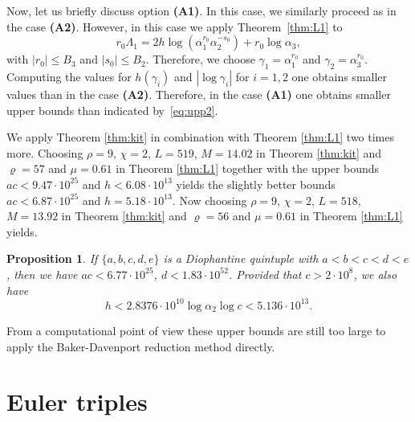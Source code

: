 \documentclass{amsart}
\newtheorem{proposition}{Proposition}
\theoremstyle{definition}
\begin{document}
Now, let us briefly discuss option \textbf{(A1)}. In this case, we similarly proceed as in the case \textbf{(A2)}.
However, in this case we apply Theorem~\ref{thm:L1} to 
$$
r_0\Lambda_1 = 2h\log\left(\alpha_1^{r_0} \alpha_2^{-s_0}\right) + r_0\log\alpha_3,
$$
with $|r_0|\le B_3$ and $|s_0|\le B_2$. Therefore, we choose $\gamma_1= \alpha_1^{r_0}$ and $\gamma_2=\alpha_3^{r_0}$.
Computing the values for $h(\gamma_i)$ and $|\log \gamma_i|$ for $i=1,2$ one obtains smaller values than
in the case \textbf{(A2)}. Therefore, in the case \textbf{(A1)} one obtains smaller upper bounds than indicated by~\eqref{eq:upp2}.

We apply Theorem \ref{thm:kit} in combination with Theorem \ref{thm:L1} two times more. Choosing $\rho=9$, $\chi=2$, $L=519$,
$M=14.02$ in Theorem \ref{thm:kit} and $\varrho=57$ and $\mu=0.61$ in Theorem \ref{thm:L1} together with the upper bounds
$ac<9.47\cdot 10^{25}$ and $h<6.08\cdot 10^{13}$ yields the slightly better bounds $ac<6.87\cdot 10^{25}$ and $h=5.18\cdot 10^{13}$. 
Now choosing $\rho=9$, $\chi=2$, $L=518$, $M=13.92$ in Theorem \ref{thm:kit} and $\varrho=56$ and $\mu=0.61$ in Theorem \ref{thm:L1} yields.

\begin{proposition}\label{pro:2}
  If $\{a,b,c,d,e\}$ is a Diophantine quintuple with $a < b < c < d < e$, then we have 
  $ac<6.77\cdot 10^{25}$, $d<1.83\cdot 10^{52}$. Provided that $c>2\cdot 10^8$, we also have
  \begin{equation}\label{eq:hh2}
h<2.8376 \cdot 10^{10} \log \alpha_2 \log c<5.136\cdot 10^{13}.
\end{equation}  
\end{proposition}

From a computational point of view these upper bounds are still too large to apply the Baker-Davenport reduction method directly.

\section{Euler triples} \label{sec:7}
\end{document}
